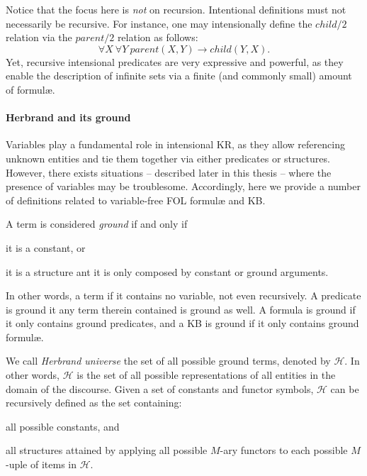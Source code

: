 \documentclass[12pt,a4paper,openright,twoside]{book}
\begin{document}
Notice that the focus here is \emph{not} on recursion.
%
Intentional definitions must not necessarily be recursive.
%
For instance, one may intensionally define the $child/2$ relation via the $parent/2$ relation as follows:
%
\begin{equation*}
    \forall X ~ \forall Y\ parent(X, Y) \rightarrow child(Y, X).
\end{equation*}
%
Yet, recursive intensional predicates are very expressive and powerful, as they enable the description of infinite sets via a finite (and commonly small) amount of formul\ae{}.

\paragraph{Herbrand and its ground}\label{par:herbrand}

Variables play a fundamental role in intensional KR, as they allow referencing unknown entities and tie them together via either predicates or structures.
%
However, there exists situations -- described later in this thesis -- where the presence of variables may be troublesome.
%
Accordingly, here we provide a number of definitions related to variable-free FOL formul\ae{} and KB.

A term is considered \emph{ground} if and only if
%
\begin{inlinelist}
    \item it is a constant, or
    \item it is a structure ant it is only composed by constant or ground arguments.
\end{inlinelist}
%
In other words, a term if it contains no variable, not even recursively.
%
A predicate is ground it any term therein contained is ground as well.
%
A formula is ground if it only contains ground predicates, and a KB is ground if it only contains ground formul\ae{}.

We call \emph{Herbrand universe} the set of all possible ground terms, denoted by $\mathcal{H}$.
%
In other words, $\mathcal{H}$ is the set of all possible representations of all entities in the domain of the discourse.
%
Given a set of constants and functor symbols, $\mathcal{H}$ can be recursively defined as the set containing:
%
\begin{inlinelist}
    \item all possible constants, and
    \item all structures attained by applying all possible $M$-ary functors to each possible $M$-uple of items in $\mathcal{H}$.
\end{inlinelist}
\end{document}
